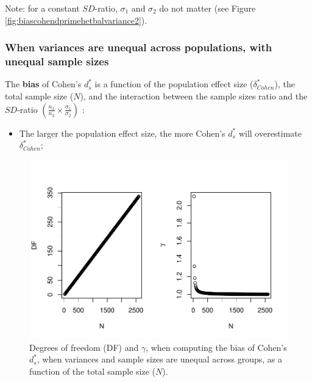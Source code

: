 \documentclass[
  english,
  man]{apa6}
\providecommand{\tightlist}{%
  \setlength{\itemsep}{0pt}\setlength{\parskip}{0pt}}
\begin{document}
Note: for a constant \(SD\)-ratio, \(\sigma_1\) and \(\sigma_2\) do not matter (see Figure \ref{fig:biascohendprimehetbalvariance2}).

\hypertarget{when-variances-are-unequal-across-populations-with-unequal-sample-sizes}{%
\subsubsection{When variances are unequal across populations, with unequal sample sizes}\label{when-variances-are-unequal-across-populations-with-unequal-sample-sizes}}

The \textbf{bias} of Cohen's \(d^*_s\) is a function of the population effect size (\(\delta^*_{Cohen}\)), the total sample size (\(N\)), and the interaction between the sample sizes ratio and the \(SD\)-ratio \(\left(\frac{n_1}{n_2}\times\frac{\sigma_1}{\sigma_2} \right)\) :

\begin{itemize}
\tightlist
\item
  The larger the population effect size, the more Cohen's \(d^*_s\) will overestimate \(\delta^*_{Cohen}\);
\end{itemize}

\begin{figure}
\centering
\includegraphics{Theoretical-Bias-of-all-estimators-as-a-function-of-population-parameters_files/figure-latex/biascohendprimehetunbalNsize2-1.pdf}
\caption{\label{fig:biascohendprimehetunbalNsize2}Degrees of freedom (DF) and \(\gamma\), when computing the bias of Cohen's \(d^*_s\), when variances and sample sizes are unequal across groups, as a function of the total sample size (\(N\)).}
\end{figure}
\end{document}
